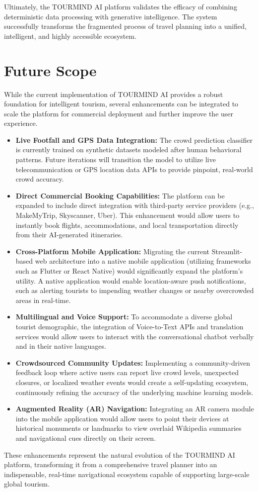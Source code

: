 Ultimately, the TOURMIND AI platform validates the efficacy of combining deterministic data processing with generative intelligence. The system successfully transforms the fragmented process of travel planning into a unified, intelligent, and highly accessible ecosystem.

\section{Future Scope}
\label{sec:futurescope}

While the current implementation of TOURMIND AI provides a robust foundation for intelligent tourism, several enhancements can be integrated to scale the platform for commercial deployment and further improve the user experience.

\begin{itemize}
    \item \textbf{Live Footfall and GPS Data Integration:} The crowd prediction classifier is currently trained on synthetic datasets modeled after human behavioral patterns. Future iterations will transition the model to utilize live telecommunication or GPS location data APIs to provide pinpoint, real-world crowd accuracy.
    \item \textbf{Direct Commercial Booking Capabilities:} The platform can be expanded to include direct integration with third-party service providers (e.g., MakeMyTrip, Skyscanner, Uber). This enhancement would allow users to instantly book flights, accommodations, and local transportation directly from their AI-generated itineraries.
    \item \textbf{Cross-Platform Mobile Application:} Migrating the current Streamlit-based web architecture into a native mobile application (utilizing frameworks such as Flutter or React Native) would significantly expand the platform's utility. A native application would enable location-aware push notifications, such as alerting tourists to impending weather changes or nearby overcrowded areas in real-time.
    \item \textbf{Multilingual and Voice Support:} To accommodate a diverse global tourist demographic, the integration of Voice-to-Text APIs and translation services would allow users to interact with the conversational chatbot verbally and in their native languages.
    \item \textbf{Crowdsourced Community Updates:} Implementing a community-driven feedback loop where active users can report live crowd levels, unexpected closures, or localized weather events would create a self-updating ecosystem, continuously refining the accuracy of the underlying machine learning models.
    \item \textbf{Augmented Reality (AR) Navigation:} Integrating an AR camera module into the mobile application would allow users to point their devices at historical monuments or landmarks to view overlaid Wikipedia summaries and navigational cues directly on their screen.
\end{itemize}

These enhancements represent the natural evolution of the TOURMIND AI platform, transforming it from a comprehensive travel planner into an indispensable, real-time navigational ecosystem capable of supporting large-scale global tourism.
